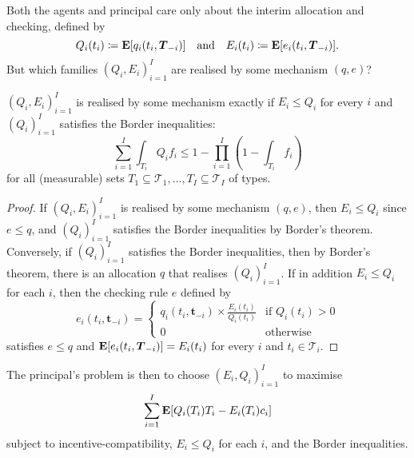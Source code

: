 Both the agents and principal care only about the interim allocation and checking, defined by
%
\begin{equation*}
	Q_i(t_i)
	\coloneqq \E \left[ q_i(t_i,\boldsymbol{T}_{-i}) \right] 
	\quad \text{and} \quad
	E_i(t_i)
	\coloneqq \E \left[ e_i(t_i,\boldsymbol{T}_{-i}) \right] .
\end{equation*}
%
But which families $(Q_i,E_i)_{i=1}^I$ are realised by some mechanism $(q,e)$?

\begin{lemma}
	\label{lemma:bdl14_border}
	$(Q_i,E_i)_{i=1}^I$ is realised by some mechanism
	exactly if $E_i \leq Q_i$ for every $i$ and $(Q_i)_{i=1}^I$ satisfies the Border inequalities:
	\begin{equation*}
		\sum_{i=1}^I \int_{T_i} Q_i f_i
		\leq 1 - \prod_{i=1}^I \left( 1 - \int_{T_i} f_i \right)
	\end{equation*}
	for all (measurable) sets $T_1 \subseteq \mathcal{T}_1, \dots, T_I \subseteq \mathcal{T}_I$ of types.
\end{lemma}

\begin{proof}
	If $(Q_i,E_i)_{i=1}^I$ is realised by some mechanism $(q,e)$,
	then $E_i \leq Q_i$ since $e \leq q$,
	and $(Q_i)_{i=1}^I$ satisfies the Border inequalities
	by Border's theorem.
	Conversely, if $(Q_i)_{i=1}^I$ satisfies the Border inequalities,
	then by Border's theorem,
	there is an allocation $q$ that realises $(Q_i)_{i=1}^I$.
	If in addition $E_i \leq Q_i$ for each $i$,
	then the checking rule $e$ defined by
	\begin{equation*}
		e_i(t_i,\boldsymbol{t}_{-i})
		=
		\begin{cases}
			q_i(t_i,\boldsymbol{t}_{-i}) \times \frac{E_i(t_i)}{Q_i(t_i)}
			& \text{if $Q_i(t_i)>0$} \\
			0
			& \text{otherwise}
		\end{cases}
	\end{equation*}
	satisfies $e \leq q$
	and $\E\left[ e_i(t_i,\boldsymbol{T}_{-i}) \right] = E_i(t_i)$ for every $i$ and $t_i \in \mathcal{T}_i$.
\end{proof}


The principal's problem is then to choose $(E_i,Q_i)_{i=1}^I$ to maximise
%
\begin{equation*}
	\sum_{i=1}^I \E\left[ Q_i(T_i) T_i - E_i(T_i) c_i \right]
\end{equation*}
%
subject to incentive-compatibility,
$E_i \leq Q_i$ for each $i$,
and the Border inequalities.



